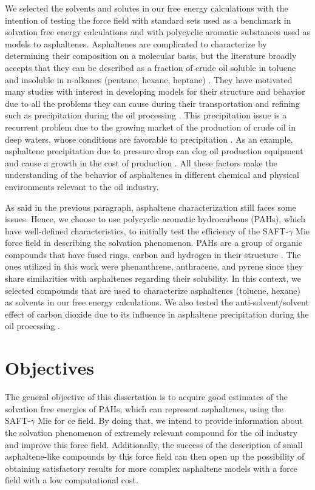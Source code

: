 We selected the solvents and solutes in our free energy calculations with the intention of testing the force field with standard sets used as a benchmark in solvation free energy calculations and with polycyclic aromatic substances used as models to asphaltenes. Asphaltenes are complicated to characterize by determining their composition on a molecular basis, but the literature broadly accepts that they can be described as a fraction of crude oil soluble in toluene and insoluble in n-alkanes (pentane, hexane, heptane) \cite{SJOBLOM2003399}. They have motivated many studies with interest in developing models for their structure and behavior due to all the problems they can cause during their transportation and refining such as precipitation during the oil processing \cite{SJOBLOM20151}. This precipitation issue is a recurrent problem due to the growing market of the production of crude oil in deep waters, whose conditions are favorable to precipitation \cite{AIC:AIC10243}. As an example, asphaltene precipitation due to pressure drop can clog oil production equipment and cause a growth in the cost of production \cite{doi:10.1021/ef010047l}. All these factors make the understanding of the behavior of asphaltenes in different chemical and physical environments relevant to the oil industry. 

As said in the previous paragraph, asphaltene characterization still faces some issues. Hence, we choose to use polycyclic aromatic hydrocarbons (PAHs), which have well-defined characteristics, to initially test the efficiency of the SAFT-$\gamma$ Mie force field in describing the solvation phenomenon. PAHs are a group of organic compounds that have fused rings, carbon and hydrogen in their structure \cite{RAVINDRA20082895}. The ones utilized in this work were phenanthrene, anthracene, and pyrene since they share similarities with asphaltenes regarding their solubility. In this context,  we selected compounds that are used to characterize asphaltenes (toluene, hexane) as solvents in our free energy calculations. We also tested the anti-solvent/solvent effect of carbon dioxide due to its influence in asphaltene precipitation during the oil processing \cite{SOROUSH2014405}.

\chapter{Objectives} %

The general objective of this dissertation is to acquire good estimates of the solvation free energies of PAHs, which can represent asphaltenes, using the SAFT-$\gamma$ Mie for ce field. By doing that, we intend to provide information about the solvation phenomenon of extremely relevant compound for the oil industry and improve this force field. Additionally, the success of the description of small asphaltene-like compounds by this force field can then open up the possibility of obtaining satisfactory results for more complex asphaltene models with a force field with a low computational cost.


